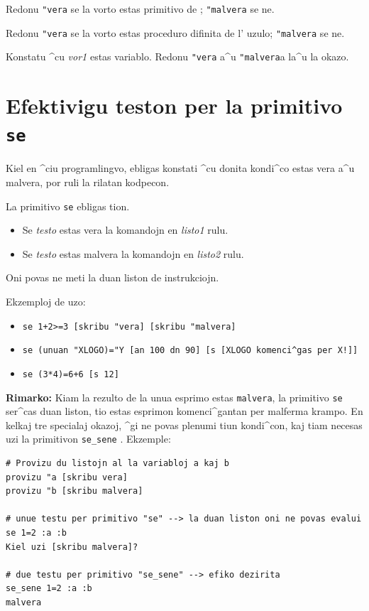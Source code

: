 
Redonu \texttt{"vera} se la vorto estas primitivo de \xlogo;
\texttt{"malvera} se ne.


Redonu \texttt{"vera} se la vorto estas proceduro difinita de l' uzulo;
\texttt{"malvera} se ne.


Konstatu ^cu \textit{vor1} estas variablo.  Redonu \texttt{"vera} a^u
\texttt{"malvera}a la^u la okazo.

\section{Efektivigu teston per la primitivo \texttt{se}}

Kiel en ^ciu programlingvo, \logo{} ebligas konstati ^cu donita
kondi^co estas vera a^u malvera, por ruli la rilatan kodpecon.

La primitivo \texttt{se} ebligas tion.


\begin{itemize}
\item Se \textit{testo} estas vera la komandojn en \textit{listo1} rulu.
\item Se \textit{testo} estas malvera la komandojn en \textit{listo2} rulu.
\end{itemize}

Oni povas ne meti la duan liston de instrukciojn.

Ekzemploj de uzo:
\begin{itemize}
\item \texttt{se 1+2>=3 [skribu "vera] [skribu "malvera]}
\item \texttt{se (unuan "XLOGO)="Y  [an 100 dn 90] [s [XLOGO komenci^gas per X!]]}
\item \texttt{se (3*4)=6+6 [s 12]}
\end{itemize}
\vspace{0.2cm}

\textbf{Rimarko:} Kiam la rezulto de la unua esprimo estas
\texttt{malvera}, la primitivo \texttt{se} ser^cas duan liston, tio
estas esprimon komenci^gantan per malferma krampo.  En kelkaj tre
specialaj okazoj, ^gi ne povas plenumi tiun kondi^con, kaj tiam
necesas uzi la primitivon \texttt{se\_sene} .
Ekzemple:
\begin{verbatim}
# Provizu du listojn al la variabloj a kaj b
provizu "a [skribu vera]
provizu "b [skribu malvera]

# unue testu per primitivo "se" --> la duan liston oni ne povas evalui
se 1=2 :a :b 
Kiel uzi [skribu malvera]?

# due testu per primitivo "se_sene" --> efiko dezirita
se_sene 1=2 :a :b
malvera
\end{verbatim}

